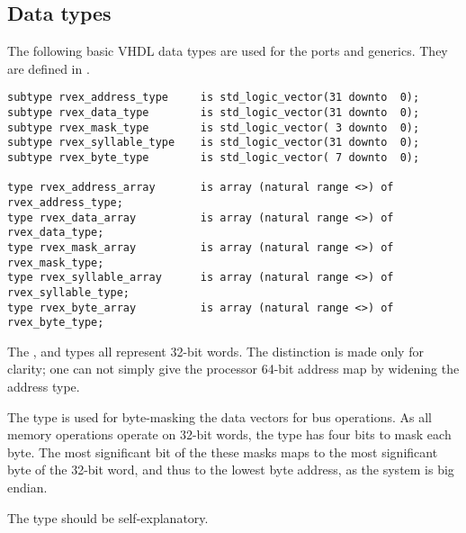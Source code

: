 
\subsection{Data types}
\label{sec:core-ug-inst-types}

The following basic VHDL data types are used for the ports and generics. They
are defined in .

\begin{lstlisting}[numbers=none]
subtype rvex_address_type     is std_logic_vector(31 downto  0);
subtype rvex_data_type        is std_logic_vector(31 downto  0);
subtype rvex_mask_type        is std_logic_vector( 3 downto  0);
subtype rvex_syllable_type    is std_logic_vector(31 downto  0);
subtype rvex_byte_type        is std_logic_vector( 7 downto  0);

type rvex_address_array       is array (natural range <>) of rvex_address_type;
type rvex_data_array          is array (natural range <>) of rvex_data_type;
type rvex_mask_array          is array (natural range <>) of rvex_mask_type;
type rvex_syllable_array      is array (natural range <>) of rvex_syllable_type;
type rvex_byte_array          is array (natural range <>) of rvex_byte_type;
\end{lstlisting}

\noindent The ,  and  types all 
represent 32-bit words. The distinction is made only for clarity; one can not 
simply give the \rvex{} processor 64-bit address map by widening the address 
type.

The  type is used for byte-masking the data vectors for bus
operations. As all memory operations operate on 32-bit words, the 
type has four bits to mask each byte. The most significant bit of the these
masks maps to the most significant byte of the 32-bit word, and thus to the
lowest byte address, as the \rvex{} system is big endian.

The  type should be self-explanatory.

